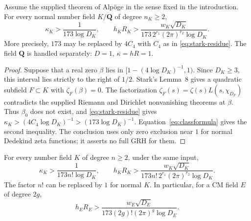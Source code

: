 \begin{theorem}
\label{NX01}
Assume the supplied theorem of Alp\"oge in the sense fixed in the
introduction. For every normal number field $K/\mathbf Q$ of degree
$n_K\geq2$,
\begin{equation}\label{eq:normal-lower}
 \boxed{\quad
 \kappa_K>\frac1{173\log D_K},\qquad
 h_KR_K>
 \frac{w_K\sqrt{D_K}}
 {173\,2^{r_1}(2\pi)^{r_2}\log D_K}.
 \quad}
\end{equation}
More precisely, $173$ may be replaced by $4C_4$ with $C_4$ as in
\eqref{eq:stark-residue}. The field $\mathbf Q$ is handled separately:
$D=1$, $\kappa=hR=1$.
\end{theorem}

\begin{proof}
Suppose that a real zero $\beta$ lies in
$[1-(4\log D_K)^{-1},1)$. Since $D_K\geq3$, this interval lies strictly
to the right of $1/2$. Stark's Lemma~8 gives a quadratic subfield
$F\subset K$ with $\zeta_F(\beta)=0$. The factorization
$\zeta_F(s)=\zeta(s)L(s,\chi_{D_F})$ contradicts the supplied
Riemann and Dirichlet nonvanishing theorems at $\beta$.
Thus $\beta_0$ does not exist, and \eqref{eq:stark-residue} gives
$\kappa_K>(4C_4\log D_K)^{-1}>(173\log D_K)^{-1}$.
Equation~\eqref{eq:classformula} gives the second inequality.
The conclusion uses only zero exclusion near $1$ for normal Dedekind
zeta functions; it asserts no full GRH for them.
\end{proof}

\begin{theorem}
\label{NX02}
For every number field $K$ of degree $n\geq2$, under the same input,
\begin{equation}\label{eq:all-fields-lower}
 \boxed{\quad
 \kappa_K>\frac1{173n!\log D_K},\qquad
 h_KR_K>
 \frac{w_K\sqrt{D_K}}
 {173n!\,2^{r_1}(2\pi)^{r_2}\log D_K}.
 \quad}
\end{equation}
The factor $n!$ can be replaced by $1$ for normal $K$. In particular,
for a CM field $E$ of degree $2g$,
\begin{equation}\label{eq:cm-hR}
 h_ER_E>\frac{w_E\sqrt{D_E}}
 {173(2g)!(2\pi)^g\log D_E}.
\end{equation}
\end{theorem}

